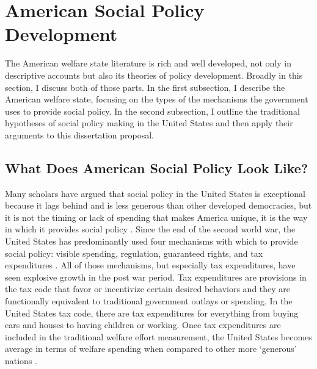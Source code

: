 \documentclass[12pt]{article}
\begin{document}
\section{American Social Policy Development}

The American welfare state literature is rich and well developed, not only in descriptive accounts but also its theories of policy development. Broadly in this section, I discuss both of those parts. In the first subsection, I describe the American welfare state, focusing on the types of the mechanisms the government uses to provide social policy. In the second subsection, I outline the traditional hypotheses of social policy making in the United States and then apply their arguments to this dissertation proposal. 

\subsection{What Does American Social Policy Look Like?}
Many scholars have argued that social policy in the United States is exceptional because it lags behind and is less generous than other developed democracies, but it is not the timing or lack of spending that makes America unique, it is the way in which it provides social policy \citep{hacker2002}. Since the end of the second world war, the United States has predominantly used four mechanisms with which to provide social policy: visible spending, regulation, guaranteed rights, and tax expenditures \citep{pierson2007}. All of those mechanisms, but especially tax expenditures, have seen explosive growth in the post war period. Tax expenditures are provisions in the tax code that favor or incentivize certain desired behaviors and they are functionally equivalent to traditional government outlays or spending. In the United States tax code, there are tax expenditures for everything from buying cars and houses to having children or working. Once tax expenditures are included in the traditional welfare effort measurement, the United States becomes average in terms of welfare spending when compared to other more `generous' nations \citep[Ch. 1]{howard2008}.
\end{document}
